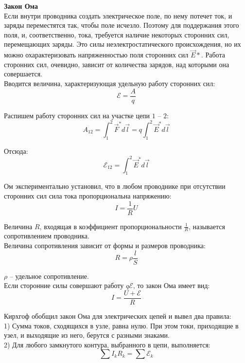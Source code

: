 \documentclass{article}
\begin{document}
	
	\textbf{Закон Ома}\\

	Если внутри проводника создать электрическое поле, по нему потечет ток, и заряды переместятся так, чтобы поле исчезло. Поэтому для поддержания этого поля, и, соответственно, тока, требуется наличие некоторых сторонних сил, перемещающих заряды. Это силы неэлектростатического происхождения, но их можно охарактеризовать напряженностью поля сторонних сил $\vec E*$. Работа сторонних сил, очевидно, зависит от количества зарядов, над которыми она совершается.\\

	Вводится величина, характеризующая удельную работу сторонних сил:
	\begin{equation}
		\mathcal{E} = \frac{A}{q}
	\end{equation}

	Распишем работу сторонних сил на участке цепи $1$ -- $2$:
	\begin{equation}
		A_{12} = \int_1^2\vec F^* d\vec l = q\int_1^2 \vec E^* d\vec l
	\end{equation}

	Отсюда:
	\begin{equation}
		\mathcal{E}_{12} = \int_1^2 \vec E^* d\vec l
	\end{equation}

	Ом экспериментально установил, что в любом проводнике при отсутствии сторонних сил сила тока пропорциональна напряжению:
	\begin{equation}
		I = \frac{1}{R} U
	\end{equation}

	Величина $R$, входящая в коэффициент пропорциональности $\frac{1}{R}$, называется сопротивлением проводника.\\

	Величина сопротивления зависит от формы и размеров проводника:
	\begin{equation}
		R = \rho\frac{l}{S}
	\end{equation}

	$\rho$ -- удельное сопротивление. \\

	Если сторонние силы совершают работу $q\mathcal{E}$, то закон Ома имеет вид:
	\begin{equation}
		I = \frac{U + \mathcal{E}}{R}
	\end{equation}

	Кирхгоф обобщил закон Ома для электрических цепей и вывел два правила:\\
	1) Сумма токов, сходящихся в узле, равна нулю. При этом токи, приходящие в узел, и выходящие из него, берутся с разными знаками.\\
	2) Для любого замкнутого контура, выбранного в цепи, выполняется:
	\begin{equation}
		\sum I_kR_k = \sum \mathcal{E}_k
	\end{equation}
\end{document}
